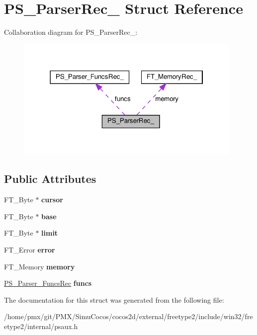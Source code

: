 \hypertarget{structPS__ParserRec__}{}\section{P\+S\+\_\+\+Parser\+Rec\+\_\+ Struct Reference}
\label{structPS__ParserRec__}


Collaboration diagram for P\+S\+\_\+\+Parser\+Rec\+\_\+\+:
\nopagebreak
\begin{figure}[H]
\begin{center}
\leavevmode
\includegraphics[width=310pt]{structPS__ParserRec____coll__graph}
\end{center}
\end{figure}
\subsection*{Public Attributes}
\begin{DoxyCompactItemize}
\item 
\mbox{\label{structPS__ParserRec___a9297419d944dddeb6fe69b706babf4d9}} 
F\+T\+\_\+\+Byte $\ast$ {\bfseries cursor}
\item 
\mbox{\label{structPS__ParserRec___ab9b9e20345b7e63b7edd3ae028c2f831}} 
F\+T\+\_\+\+Byte $\ast$ {\bfseries base}
\item 
\mbox{\label{structPS__ParserRec___a36a2e05f2ce68a4ac8085fd0d22fffb6}} 
F\+T\+\_\+\+Byte $\ast$ {\bfseries limit}
\item 
\mbox{\label{structPS__ParserRec___a7a1432cb4d8bb603663f1258224c8ec4}} 
F\+T\+\_\+\+Error {\bfseries error}
\item 
\mbox{\label{structPS__ParserRec___a3e2206deb6c0d73f51c8c71d5db1db1f}} 
F\+T\+\_\+\+Memory {\bfseries memory}
\item 
\mbox{\label{structPS__ParserRec___a450031fd9e77e55bf424dc64a8d2659d}} 
\hyperlink{structPS__Parser__FuncsRec__}{P\+S\+\_\+\+Parser\+\_\+\+Funcs\+Rec} {\bfseries funcs}
\end{DoxyCompactItemize}


The documentation for this struct was generated from the following file\+:\begin{DoxyCompactItemize}
\item 
/home/pmx/git/\+P\+M\+X/\+Simu\+Cocos/cocos2d/external/freetype2/include/win32/freetype2/internal/psaux.\+h\end{DoxyCompactItemize}
